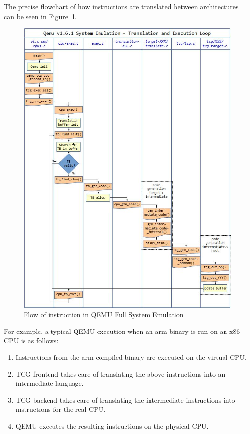 The precise flowchart of how instructions are translated between architectures can be seen in Figure~\ref{fig:qemuflow}.

\begin{figure}[htp]
\centering
\includegraphics[width=\linewidth]{images/qemutcg.jpg}
\caption{Flow of instruction in QEMU Full System Emulation}
\label{fig:qemuflow}
\end{figure}

For example, a typical QEMU execution when an arm binary is run on an x86 CPU is as follows: 
\begin{enumerate}
    \item Instructions from the arm compiled binary are executed on the virtual CPU.
    \item TCG frontend takes care of translating the above instructions into an intermediate language. 
    \item TCG backend takes care of translating the intermediate instructions into instructions for the real CPU. 
    \item QEMU executes the resulting instructions on the physical CPU. 
\end{enumerate}
